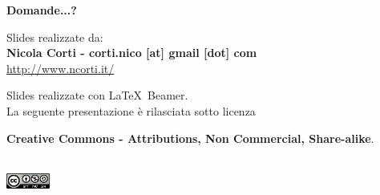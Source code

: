 \documentclass[xcolor=svgnames,11pt]{beamer}
\begin{document}
\begin{frame}{}

\begin{center}
\begin{Huge}
{\color{android} \textbf{Domande...?}}
\end{Huge}

\vspace{1.5cm}
\begin{small}
Slides realizzate da:\\
\textbf{Nicola Corti - corti.nico [at] gmail [dot] com}\\
\url{http://www.ncorti.it/}

\bigskip

Slides realizzate con \LaTeX\ Beamer.\\
La seguente presentazione \`e rilasciata sotto licenza\\
\begin{footnotesize}	\textbf{Creative Commons - Attributions, Non Commercial, Share-alike}.
\end{footnotesize}
\\
\medskip
\includegraphics[height=0.5cm]{cc.png}

\end{small}
\end{center}
\end{frame}
\end{document}

